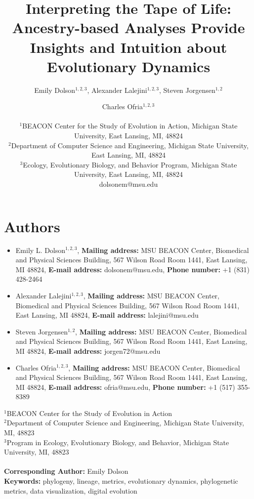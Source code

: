 \documentclass[letterpaper]{article}
\title{Interpreting the Tape of Life: Ancestry-based Analyses Provide Insights and Intuition about Evolutionary Dynamics}
\author{Emily Dolson$^{1,2,3}$, Alexander Lalejini$^{1,2, 3}$, Steven Jorgensen$^{1,2}$ \and Charles Ofria$^{1,2, 3}$ \\
\mbox{}\\
$^1$BEACON Center for the Study of Evolution in Action, Michigan State University, East Lansing, MI, 48824 \\
$^2$Department of Computer Science and Engineering, Michigan State University, East Lansing, MI, 48824 \\
$^3$Ecology, Evolutionary Biology, and Behavior Program, Michigan State University, East Lansing, MI, 48824 \\
dolsonem@msu.edu} %
\begin{document}
\section{Authors}
\begin{spacing}{1}

\begin{itemize}
\item Emily L. Dolson$^{1,2,3}$, \textbf{Mailing address:} MSU BEACON Center, Biomedical and Physical Sciences Building, 567 Wilson Road Room 1441, East Lansing, MI 48824,  \textbf{E-mail address:} dolsonem@msu.edu,  \textbf{Phone number:} +1 (831) 428-2464
\item Alexander Lalejini$^{1,2,3}$,  \textbf{Mailing address:} MSU BEACON Center, Biomedical and Physical Sciences Building, 567 Wilson Road Room 1441, East Lansing, MI 48824,  \textbf{E-mail address:} lalejini@msu.edu
\item Steven Jorgensen$^{1,2}$,  \textbf{Mailing address:} MSU BEACON Center, Biomedical and Physical Sciences Building, 567 Wilson Road Room 1441, East Lansing, MI 48824,  \textbf{E-mail address:} jorgen72@msu.edu 
\item Charles Ofria$^{1,2,3}$,  \textbf{Mailing address:} MSU BEACON Center, Biomedical and Physical Sciences Building, 567 Wilson Road Room 1441, East Lansing, MI 48824,  \textbf{E-mail address:} ofria@msu.edu,  \textbf{Phone number:} +1 (517) 355-8389
\end{itemize}
$^1$BEACON Center for the Study of Evolution in Action  \\
$^2$Department of Computer Science and Engineering, Michigan State University, MI, 48823 \\
$^3$Program in Ecology, Evolutionary Biology, and Behavior, Michigan State University, MI, 48823 \\
\\
\textbf{Corresponding Author:} Emily Dolson
\\
\textbf{Keywords:} phylogeny, lineage, metrics, evolutionary dynamics, phylogenetic metrics, data visualization, digital evolution

\end{spacing}
\end{document}
